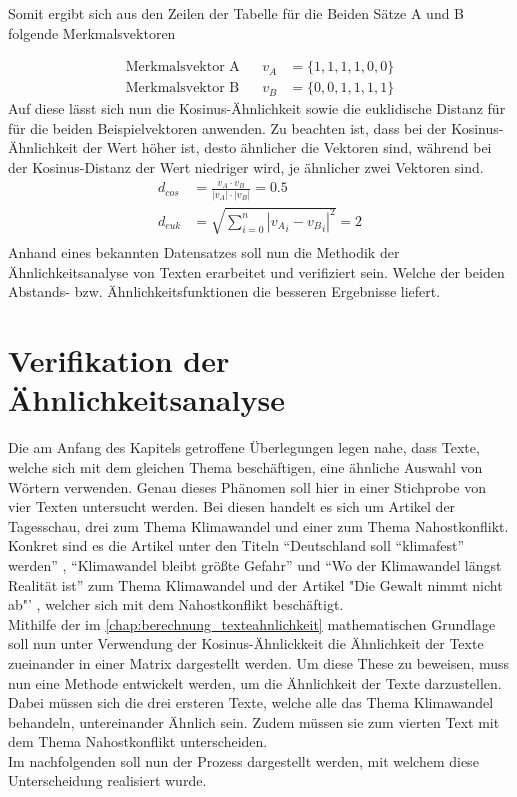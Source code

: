 Somit ergibt sich aus den Zeilen der Tabelle für die Beiden Sätze A und B folgende Merkmalsvektoren

\begin{equation}
	\begin{aligned} 
		\text{Merkmalsvektor A}&& v_{A}&=\{1,1,1,1,0,0\}  \\
		\text{Merkmalsvektor B}&& v_{B}&=\{0,0,1,1,1,1\}
	\end{aligned} 
\label{eq:merkmalsvektoren}
\end{equation}
Auf diese lässt sich nun die Kosinus-Ähnlichkeit sowie die euklidische Distanz für für die beiden Beispielvektoren anwenden. Zu beachten ist, dass bei der Kosinus-Ähnlichkeit der Wert höher ist, desto ähnlicher die Vektoren sind, während bei der Kosinus-Distanz der Wert niedriger wird, je ähnlicher zwei Vektoren sind. 
\begin{equation}
	\begin{aligned} 
		{d}_{cos}&=\frac{v_{A}\cdot v_{B}}{\left|v_{A}\right|\cdot \left|v_{B}\right|} = 0.5\\
		{d}_{euk}&=\sqrt{\sum _{i=0}^{n}{\left|{v_{A}}_{i}-{v_{B}}_{i}\right|}^{2}} = 2 \\  
	\end{aligned} 
	\label{eq:distance}
\end{equation}
Anhand eines bekannten Datensatzes soll nun die Methodik der Ähnlichkeitsanalyse von Texten erarbeitet und verifiziert sein. Welche der beiden Abstands- bzw. Ähnlichkeitsfunktionen die besseren Ergebnisse liefert.
\section{Verifikation der Ähnlichkeitsanalyse}
Die am Anfang des Kapitels getroffene Überlegungen legen nahe, dass Texte, welche sich mit dem gleichen Thema beschäftigen, eine ähnliche Auswahl von Wörtern verwenden. Genau dieses Phänomen soll hier in einer Stichprobe von vier Texten untersucht werden. Bei diesen handelt es sich um Artikel der Tagesschau, drei zum Thema Klimawandel und einer zum Thema Nahostkonflikt. Konkret sind es die Artikel unter den Titeln "`Deutschland soll "`klimafest"' werden"' , "`Klimawandel bleibt größte Gefahr"'  und "`Wo der Klimawandel längst Realität ist"'  zum Thema Klimawandel und der Artikel "Die Gewalt nimmt nicht ab"' , welcher sich mit dem Nahostkonflikt beschäftigt. \\ \newline
Mithilfe der im \autoref{chap:berechnung_texteahnlichkeit} mathematischen Grundlage soll nun unter Verwendung der Kosinus-Ähnlickkeit die Ähnlichkeit der Texte zueinander in einer Matrix dargestellt werden. Um diese These zu beweisen, muss nun eine Methode entwickelt werden, um die Ähnlichkeit der Texte darzustellen. Dabei müssen sich die drei ersteren Texte, welche alle das Thema Klimawandel behandeln, untereinander Ähnlich sein. Zudem müssen sie zum vierten Text mit dem Thema Nahostkonflikt unterscheiden. \\ \newline
Im nachfolgenden soll nun der Prozess dargestellt werden, mit welchem diese Unterscheidung realisiert wurde.
